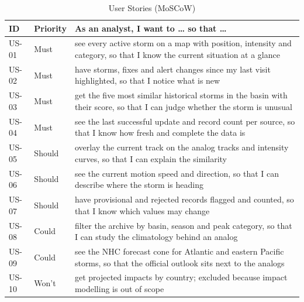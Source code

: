 \documentclass[10pt,twocolumn,letterpaper]{article}
\begin{document}
\begin{table}[t]
\caption{User Stories (MoSCoW)}\label{tab:stories}
\centering\footnotesize
\begin{tabularx}{\columnwidth}{@{}L{0.7cm}L{0.95cm}Y@{}}
\toprule
ID & Priority & As an analyst, I want to \ldots{} so that \ldots\\
\midrule
US-01 & Must & see every active storm on a map with position, intensity and category, so that I know the current situation at a glance\\
US-02 & Must & have storms, fixes and alert changes since my last visit highlighted, so that I notice what is new\\
US-03 & Must & get the five most similar historical storms in the basin with their score, so that I can judge whether the storm is unusual\\
US-04 & Must & see the last successful update and record count per source, so that I know how fresh and complete the data is\\
US-05 & Should & overlay the current track on the analog tracks and intensity curves, so that I can explain the similarity\\
US-06 & Should & see the current motion speed and direction, so that I can describe where the storm is heading\\
US-07 & Should & have provisional and rejected records flagged and counted, so that I know which values may change\\
US-08 & Could & filter the archive by basin, season and peak category, so that I can study the climatology behind an analog\\
US-09 & Could & see the NHC forecast cone for Atlantic and eastern Pacific storms, so that the official outlook sits next to the analogs\\
US-10 & Won't & get projected impacts by country; excluded because impact modelling is out of scope\\
\bottomrule
\end{tabularx}
\end{table}
\end{document}
